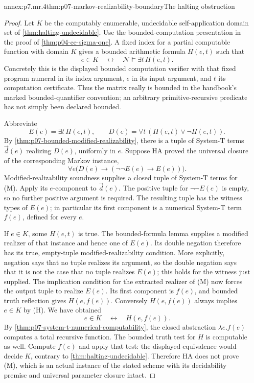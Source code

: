 \begin{annexitem}{annex:p7.mr.4}{thm:p07-markov-realizability-boundary}{The halting obstruction}
\begin{proof}
Let \(K\) be the computably enumerable, undecidable self-application
domain set of \cref{thm:halting-undecidable}. Use the bounded-computation
presentation in the proof of \cref{thm:p04-ce-sigma-one}. A fixed
index for a partial computable function with domain \(K\) gives a
bounded arithmetic formula \(H(e,t)\) such that
\[
 e\in K\quad\longleftrightarrow\quad
 \mathcal N\models\exists t\,H(e,t).
 \tag{H}
\]
Concretely this is the displayed bounded computation verifier with
that fixed program numeral in its index argument, \(e\) in its
input argument, and \(t\) its computation certificate. Thus the
matrix really is bounded in the handbook's marked bounded-quantifier
convention; an arbitrary primitive-recursive predicate has not simply
been declared bounded.

Abbreviate
\[
 E(e)=\exists t\,H(e,t),\qquad
 D(e)=\forall t\,(H(e,t)\lor\neg H(e,t)).
\]
By \cref{thm:p07-bounded-modified-realizability}, there is a tuple
of System-T terms \(\vec d(e)\) realizing \(D(e)\), uniformly in
\(e\). Suppose HA proved the universal closure of the corresponding
Markov instance,
\[
 \forall e\bigl(D(e)\to(\neg\neg E(e)\to E(e))\bigr).
 \tag{M}
\]
Modified-realizability soundness supplies a closed tuple of System-T
terms for (M). Apply its \(e\)-component to \(\vec d(e)\).
The positive tuple for \(\neg\neg E(e)\) is empty, so no further
positive argument is required. The resulting tuple has the witness
types of \(E(e)\); in particular its first component is a numerical
System-T term \(f(e)\), defined for every \(e\).

If \(e\in K\), some \(H(e,t)\) is true. The bounded-formula
lemma supplies a modified realizer of that instance and hence one of
\(E(e)\). Its double negation therefore has its true, empty-tuple
modified-realizability condition. More explicitly, negation says that
no tuple realizes its argument, so the double negation says that it is
not the case that no tuple realizes \(E(e)\); this holds for the
witness just supplied. The implication condition for the extracted
realizer of (M) now forces the output tuple to realize \(E(e)\).
Its first component is \(f(e)\), and bounded truth reflection gives
\(H(e,f(e))\). Conversely \(H(e,f(e))\) always implies \(e\in K\)
by (H). We have obtained
\[
 e\in K\quad\longleftrightarrow\quad H(e,f(e)).
\]
By \cref{thm:p07-system-t-numerical-computability}, the closed
abstraction \(\lambda e.f(e)\) computes a total recursive function.
The bounded truth test for \(H\) is computable as well. Compute
\(f(e)\) and apply that test: the displayed equivalence would
decide \(K\), contrary to \cref{thm:halting-undecidable}.
Therefore HA does not prove (M), which is an actual instance of the
stated scheme with its decidability premise and universal parameter
closure intact.


\end{proof}
\end{annexitem}
